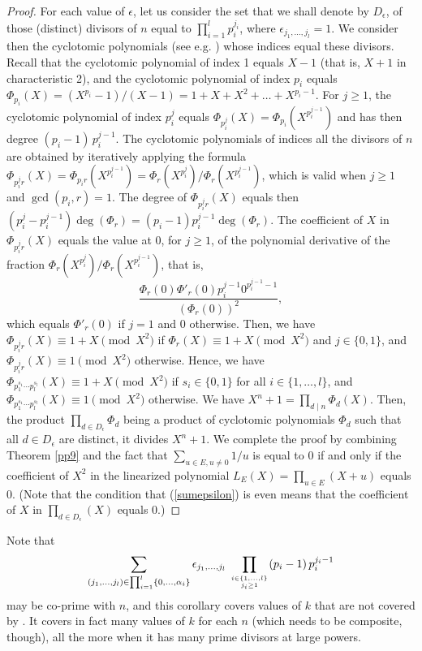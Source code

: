 \documentclass{amsart}
\numberwithin{equation}{section}
\theoremstyle{definition}
\begin{document}
\begin{proof} 
For each value of $\epsilon$, let us consider the set that we shall denote by $D_\epsilon$, of those (distinct) divisors of $n$ equal to $\prod_{i=1}^lp_i^{j_i}$, where $\epsilon_{j_1,\dots ,j_l}=1$. We consider then the cyclotomic polynomials  (see e.g. \cite{lang}) whose indices equal these divisors. Recall that the cyclotomic polynomial of index 1 equals $X-1$ (that is, $X+1$ in characteristic 2), and the cyclotomic polynomial of index $p_i$ equals $\Phi_{p_i}(X)=(X^{p_i}-1)/(X-1)=1+X+X^2+\dots +X^{p_i-1}$. For $j\geq 1$, the cyclotomic polynomial of index $p_i^j$ equals $\Phi_{p_i^j}(X)=\Phi_{p_i}(X^{p_i^{j-1}})$ and has then degree $(p_i-1)\, p_i^{j-1}$. The cyclotomic polynomials of indices all the divisors of $n$ are obtained by iteratively applying the formula  $\Phi_{p_i^jr}(X)=\Phi_{p_ir}(X^{p_i^{j-1}})=\Phi_{r}(X^{p_i^j})/\Phi_{r}(X^{p_i^{j-1}})$, which is valid when $j\geq 1$ and $\gcd(p_i,r)=1$. The degree of $\Phi_{p_i^jr}(X)$ equals then  $(p_i^j-p_i^{j-1})\deg(\Phi_r)=(p_i-1)p_i^{j-1}\deg(\Phi_r)$.  The coefficient of $X$ in $\Phi_{p_i^jr}(X)$ equals the value at 0, for $j\geq 1$, of the polynomial derivative of the fraction $\Phi_{r}(X^{p_i^j})/\Phi_{r}(X^{p_i^{j-1}})$, that is, 
\[
\frac{\Phi_{r}(0)\Phi'_{r}(0)p_i^{j-1}0^{p_i^{j-1}-1}}{(\Phi_{r}(0))^2}, 
\]
which equals $\Phi'_{r}(0)$ if $j=1$ and 0 otherwise. Then, we have $\Phi_{p_i^jr}(X)\equiv 1+X \pmod{X^2}$ if $\Phi_r(X)\equiv 1+X \pmod{X^2}$ and $j\in \{0,1\}$, and $\Phi_{p_i^jr}(X)\equiv 1\pmod{X^2}$ otherwise. Hence, we have $\Phi_{p_1^{s_1}\cdots p_l^{s_l}}(X)\equiv 1+X \pmod{X^2}$ if $s_i\in \{0,1\}$ for all $i\in \{1,\dots ,l\}$, and $\Phi_{p_1^{s_1}\cdots p_l^{s_l}}(X)\equiv 1\pmod{X^2}$ otherwise. We have $X^n+1=\prod_{d\mid n}\Phi_d(X)$. Then, %
 the product $\prod_{d\in D_\epsilon}\Phi_d$ being a product of cyclotomic polynomials $\Phi_d$ such that all $d\in D_\epsilon$ are distinct, it divides $X^n+1$. We complete the proof by combining Theorem \ref{pp9} and the fact that $\sum_{u\in E,u\neq 0}1/u$ is equal to 0 if and only if the coefficient of $X^2$ in the linearized polynomial $L_E(X)=\prod_{u\in E}(X+u)$ equals 0. (Note that the condition that (\ref{sumepsilon}) is even means that the coefficient of $X$ in $\prod_{d\in D_\epsilon}(X)$ equals 0.)
\end{proof}   

Note that 
\[
\sum_{(j_1,\dots ,j_l)\in \prod_{i=1}^l\{0,\dots ,\alpha_i\}}\epsilon_{j_1,\dots ,j_l}\, \prod_{i\in \{1,\dots ,l\}\atop j_i\geq1}(p_i-1)\, p_i^{j_i-1}
\]
may be co-prime with $n$, and this corollary covers values of $k$ that are not covered by \cite{Carlet-0,Carlet-pre}. It covers in fact many values of $k$ for each $n$ (which needs to be composite, though), all the more when it has many prime divisors at large powers.\\
\end{document}
